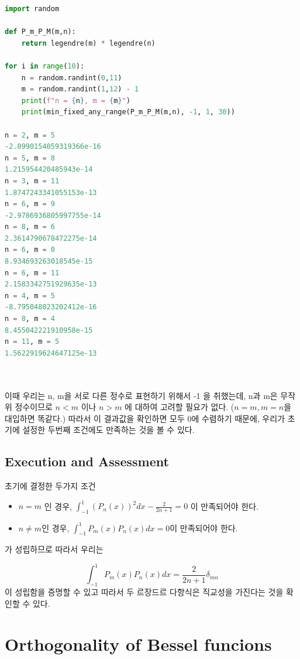 \documentclass[11pt]{article}
\begin{document}
\begin{lstlisting}[language=Python]
import random

def P_m_P_M(m,n):
    return legendre(m) * legendre(n)

for i in range(10):
    n = random.randint(0,11)
    m = random.randint(1,12) - 1
    print(f"n = {n}, m = {m}")
    print(min_fixed_any_range(P_m_P_M(m,n), -1, 1, 30))
    
n = 2, m = 5
-2.0990154059319366e-16
n = 5, m = 8
1.215954420485943e-14
n = 3, m = 11
1.8747243341055153e-13
n = 6, m = 9
-2.9786936805997755e-14
n = 8, m = 6
2.3614790678472275e-14
n = 6, m = 0
8.934693263018545e-15
n = 6, m = 11
2.1583342751929635e-13
n = 4, m = 5
-8.795048023202412e-16
n = 8, m = 4
8.455042221910958e-15
n = 11, m = 5
1.5622919624647125e-13
    
    
\end{lstlisting}
이때 우리는 n, m을 서로 다른 정수로 표현하기 위해서 -1 을 취했는데, n과 m은 무작위 정수이므로 $n < m$ 이나 $n > m$ 에 대하여 고려할 필요가 없다. ($n = m,  m = n$을 대입하면 똑같다.) 따라서 이 결과값을 확인하면 모두 0에 수렴하기 때문에, 우리가 초기에 설정한 두번째 조건에도 만족하는 것을 볼 수 있다. 

\subsection{Execution and Assessment}
초기에 결정한 두가지 조건
\begin{itemize}
\item $n = m$ 인 경우,  $\int_{-1}^1 (P_n(x))^2 dx - \frac{2}{2n + 1}  = 0 $ 이 만족되어야 한다.
\item $n \neq m$인 경우, $\int_{-1}^1 P_m(x) P_n(x) dx = 0 $이 만족되어야 한다.
\end{itemize}
가 성립하므로 따라서 우리는

\begin{equation}
\int_{-1}^1 P_m(x) P_n(x) dx = \frac{2}{2n + 1} \delta_{mn}
    \end{equation}
이 성립함을 증명할 수 있고 따라서 두 르장드르 다항식은 직교성을 가진다는 것을 확인할 수 있다.









\pagebreak
\section{Orthogonality of Bessel funcions} 
\end{document}

